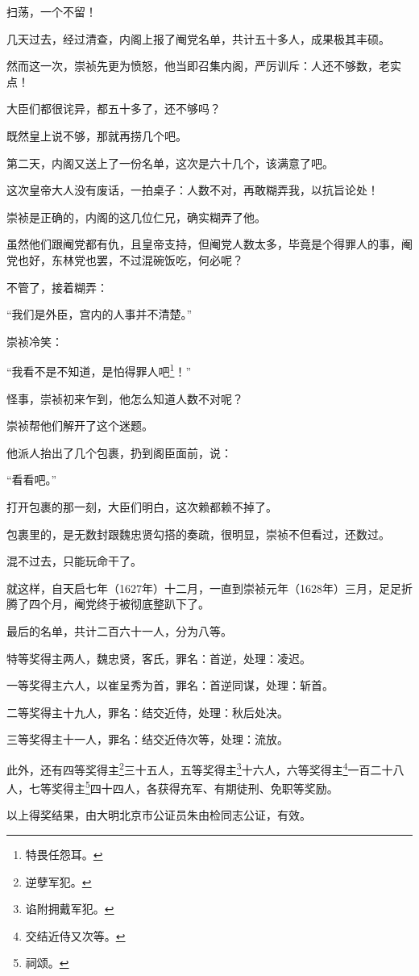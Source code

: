 \begin{multicols}{\theparacolNo}
扫荡，一个不留！

几天过去，经过清查，内阁上报了阉党名单，共计五十多人，成果极其丰硕。

然而这一次，崇祯先更为愤怒，他当即召集内阁，严厉训斥：人还不够数，老实点！

大臣们都很诧异，都五十多了，还不够吗？

既然皇上说不够，那就再捞几个吧。

第二天，内阁又送上了一份名单，这次是六十几个，该满意了吧。

这次皇帝大人没有废话，一拍桌子：人数不对，再敢糊弄我，以抗旨论处！

崇祯是正确的，内阁的这几位仁兄，确实糊弄了他。

虽然他们跟阉党都有仇，且皇帝支持，但阉党人数太多，毕竟是个得罪人的事，阉党也好，东林党也罢，不过混碗饭吃，何必呢？

不管了，接着糊弄：

“我们是外臣，宫内的人事并不清楚。”

崇祯冷笑：

“我看不是不知道，是怕得罪人吧\footnote{特畏任怨耳。}！”

怪事，崇祯初来乍到，他怎么知道人数不对呢？

崇祯帮他们解开了这个迷题。

他派人抬出了几个包裹，扔到阁臣面前，说：

“看看吧。”

打开包裹的那一刻，大臣们明白，这次赖都赖不掉了。

包裹里的，是无数封跟魏忠贤勾搭的奏疏，很明显，崇祯不但看过，还数过。

混不过去，只能玩命干了。

就这样，自天启七年（1627年）十二月，一直到崇祯元年（1628年）三月，足足折腾了四个月，阉党终于被彻底整趴下了。

最后的名单，共计二百六十一人，分为八等。

特等奖得主两人，魏忠贤，客氏，罪名：首逆，处理：凌迟。

一等奖得主六人，以崔呈秀为首，罪名：首逆同谋，处理：斩首。

二等奖得主十九人，罪名：结交近侍，处理：秋后处决。

三等奖得主十一人，罪名：结交近侍次等，处理：流放。

此外，还有四等奖得主\footnote{逆孽军犯。}三十五人，五等奖得主\footnote{谄附拥戴军犯。}十六人，六等奖得主\footnote{交结近侍又次等。}一百二十八人，七等奖得主\footnote{祠颂。}四十四人，各获得充军、有期徒刑、免职等奖励。

以上得奖结果，由大明北京市公证员朱由检同志公证，有效。


\end{multicols}
